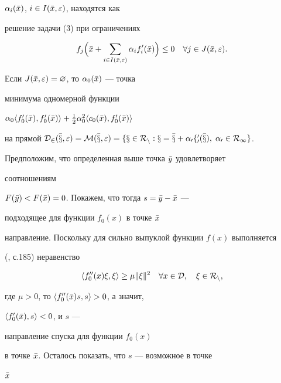 $\alpha_i(\Bar x)$, $i\in I(\Bar x,\varepsilon)$, находятся как


решение задачи (3) при ограничениях


\begin{equation}


f_j\Bigl(\Bar x+\sum_{i\in I(\Bar x,\varepsilon)}\alpha_if'_i(\Bar x)


\Bigr)\le 0\quad \forall j\in J(\Bar x,\varepsilon).


\end{equation}


Если $J(\Bar x,\varepsilon)=\varnothing$, то $\alpha_0(\Bar x)$ --- точка


минимума одномерной функции


$\alpha_0\la f'_0(\Bar x),f'_0(\Bar x)\ra+\linebreak


\frac{1}{2}\alpha^2_0 \la c_0(\Bar x),f'_0(\Bar x)\ra$


на прямой $\cal D_2(\Bar x,\varepsilon)=M(\Bar x,\varepsilon)=


\{x\in R_n:x=\Bar x+\alpha_0f'_0(\Bar x),\;\alpha_0\in R_1\}$.





Предположим, что определенная выше точка $\Bar y$ удовлетворяет


соотношениям


$F(\Bar y)<F(\Bar x)=0$. Покажем, что тогда $s=\Bar y-\Bar x$ ---


подходящее для функции $f_0(x)$ в точке $\Bar x$


направление. Поскольку для сильно выпуклой функции $f(x)$ выполняется


(\cite{Vas}, с.185) неравенство


\begin{equation}


\la f''_0(x)\xi,\xi\ra\ge \mu\|\xi\|^2\quad\forall x\in\cal D,


\quad \xi\in R_n,


\end{equation}


где $\mu>0$, то $\langle f''_0(\Bar x)s,s\rangle >0$, а значит,


$\langle f'_0(\Bar x),s\rangle<0$, и $s$ ---


направление спуска для функции $f_0(x)$


в точке $\Bar x$. Осталось показать, что $s$ --- возможное в точке


$\Bar x$


